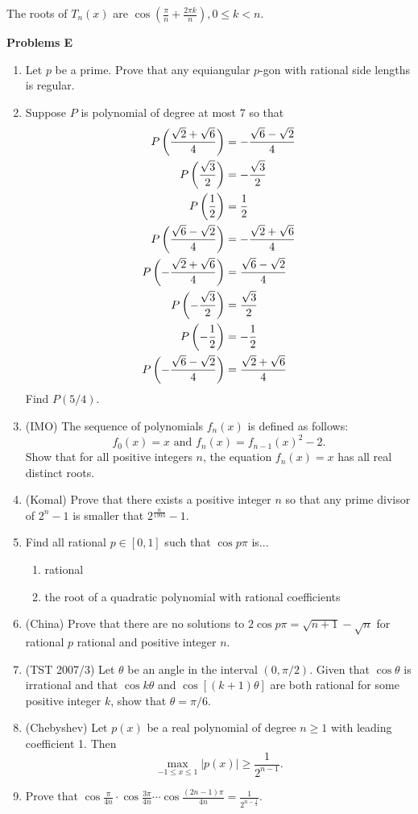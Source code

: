 The roots of $T_n(x)$ are $\cos \left(\frac{\pi}{n}+\frac{2\pi k}{n}\right), 0\leq k<n$.

\noindent \textbf{Problems E}
\begin{enumerate}
\item Let $p$ be a prime. Prove that any equiangular $p$-gon with rational side lengths is regular.

\item Suppose $P$ is polynomial of degree at most 7 so that
\begin{align*}
P\left( {\frac{\sqrt 2+\sqrt 6}{4}} \right)&=-\frac{\sqrt 6-\sqrt 2}{4}\\
P\left( {\frac{\sqrt 3}{2}} \right)&=-\frac{\sqrt{3}}{2}\\
P\left( {\frac{1}{2}} \right)&=\frac{1}{2}\\
P\left( {\frac{\sqrt 6-\sqrt 2}{4}} \right)&=-\frac{\sqrt 2+\sqrt 6}{4}\\
P\left( {-\frac{\sqrt 2+\sqrt 6}{4}} \right)&=\frac{\sqrt 6-\sqrt 2}{4}\\
P\left( {-\frac{\sqrt 3}{2}} \right)&=\frac{\sqrt{3}}{2}\\
P\left( {-\frac{1}{2}} \right)&=-\frac{1}{2}\\
P\left( {-\frac{\sqrt 6-\sqrt 2}{4}} \right)&=\frac{\sqrt 2+\sqrt 6}{4}
\end{align*}
Find $P(5/4)$.

\item (IMO) The sequence of polynomials $f_n(x)$ is defined as follows:
\[f_0(x) = x\textrm{ and }f_n(x) = f_{n-1}(x)^2-2.\]
Show that for all positive integers $n$, the equation $f_n(x)=x$ has
all real distinct roots.

\item (Komal) Prove that there exists a positive integer $n$ so that any prime divisor of $2^n-1$ is smaller that $2^{\frac{n}{1993}}-1$.

\item Find all rational $p\in [0,1]$ such that $\cos p\pi$ is...
\begin{enumerate}
\item rational
\item the root of a quadratic polynomial with rational coefficients
\end{enumerate}

\item (China) Prove that there are no solutions to $2\cos p\pi=\sqrt{n+1}-\sqrt{n}$ for rational $p$ rational and positive integer $n$.

\item (TST 2007/3) Let $\theta$ be an angle in the interval $(0,\pi/2)$. Given that $\cos \theta$ is irrational and that $\cos k\theta$ and $\cos[(k+1)\theta]$ are both rational for some positive integer $k$, show that $\theta=\pi/6$.

\item (Chebyshev) Let $p(x)$ be a real polynomial of degree $n\geq 1$ with leading coefficient 1. Then \[\max_{-1\leq x\leq 1} |p(x)|\geq \frac{1}{2^{n-1}}.\]


\item Prove that $\cos\frac{\pi}{4n}\cdot \cos\frac{3\pi}{4n}\cdots \cos\frac{(2n-1)\pi}{4n}=\frac{1}{2^{n-\frac 12}}$.

\end{enumerate}

